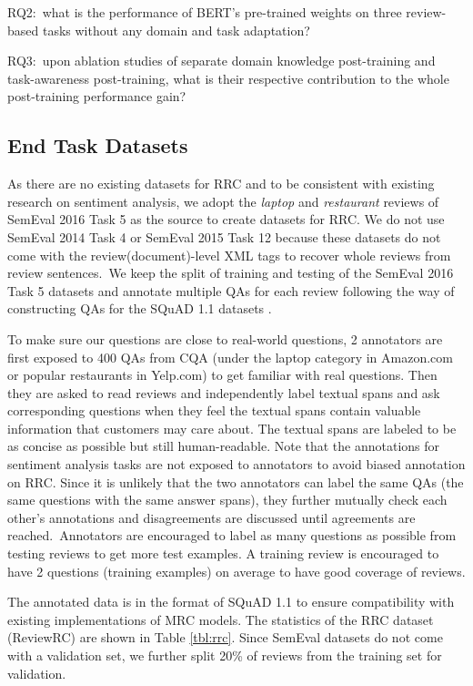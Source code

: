 \documentclass[11pt,a4paper]{article}
\begin{document}
RQ2:~what is the performance of BERT's pre-trained weights on three review-based tasks without any domain and task adaptation?

RQ3:~upon ablation studies of separate domain knowledge post-training and task-awareness post-training, what is their respective contribution to the whole post-training performance gain?

\subsection{End Task Datasets}
As there are no existing datasets for RRC and
to be consistent with existing research on sentiment analysis, we adopt the \textit{laptop} and \textit{restaurant} reviews of SemEval 2016 Task 5 as the source to create datasets for RRC.
We do not use SemEval 2014 Task 4 or SemEval 2015 Task 12 because these datasets do not come with the review(document)-level XML tags to recover whole reviews from review sentences.~We keep the split of training and testing of the SemEval 2016 Task 5 datasets and annotate multiple QAs for each review following the way of constructing QAs for the SQuAD 1.1 datasets \cite{rajpurkar2016squad}.

To make sure our questions are close to real-world questions, 2 annotators are first exposed to 400 QAs from CQA (under the laptop category in Amazon.com or popular restaurants in Yelp.com) to get familiar with real questions.
Then they are asked to read reviews and independently label textual spans and ask corresponding questions when they feel the textual spans contain valuable information that customers may care about.
The textual spans are labeled to be as concise as possible but still human-readable.
Note that the annotations for sentiment analysis tasks are not exposed to annotators to avoid biased annotation on RRC.
Since it is unlikely that the two annotators can label the same QAs (the same questions with the same answer spans), they further mutually check each other's annotations and disagreements are discussed until agreements are reached.~Annotators are encouraged to label as many questions as possible from testing reviews to get more test examples. A training review is encouraged to have 2 questions (training examples) on average to have good coverage of reviews.

The annotated data is in the format of SQuAD 1.1 \cite{rajpurkar2016squad} to ensure compatibility with existing implementations of MRC models. The statistics of the RRC dataset (ReviewRC) are shown in Table \ref{tbl:rrc}. 
Since SemEval datasets do not come with a validation set, we further split 20\% of reviews from the training set for validation.
\end{document}
